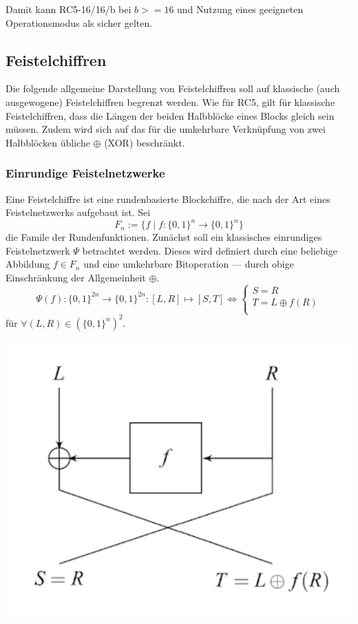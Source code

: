 \documentclass[course=erap]{aspdoc}
\begin{document}
Damit kann RC5-16/16/b bei $b >= 16$ und Nutzung eines geeigneten Operationsmodus als sicher gelten.

\subsection{Feistelchiffren}

Die folgende allgemeine Darstellung von Feistelchiffren soll auf klassische (auch ausgewogene) Feistelchiffren begrenzt werden. Wie für RC5, gilt für klassische Feistelchiffren, dass die Längen der beiden Halbblöcke eines Blocks gleich sein müssen. Zudem wird sich auf das für die umkehrbare Verknüpfung von zwei Halbblöcken übliche $\oplus$ (XOR) beschränkt.

\subsubsection{Einrundige Feistelnetzwerke}

Eine Feistelchiffre ist eine rundenbasierte Blockchiffre, die nach der Art eines Feistelnetzwerks aufgebaut ist. Sei
\[
    F_n := \{f \mid f \colon \{0, 1\}^n \to \{0, 1\}^n\}
\]
die Famile der Rundenfunktionen. Zunächst soll ein klassisches einrundiges Feistelnetzwerk $\Psi$ betrachtet werden. Dieses wird definiert durch eine beliebige Abbildung $f \in F_n$ und eine umkehrbare Bitoperation --- durch obige Einschränkung der Allgemeinheit $\oplus$.
\[
    \Psi(f) \colon \{0, 1\}^{2n} \to \{0, 1\}^{2n} \colon [L, R] \mapsto [S, T] \Leftrightarrow
        \begin{cases}
            S = R \\
            T = L \oplus f(R) \\
        \end{cases}
\]
für $\forall(L, R) \in (\{0, 1\}^n)^2$.\cite[p.11]{nachef}

\begin{center}
    \includegraphics[scale=1]{img/1_round_feistel_cipher_enc.png}\break
    \cite[Fig. 2.1]{nachef}
\end{center}
\end{document}

